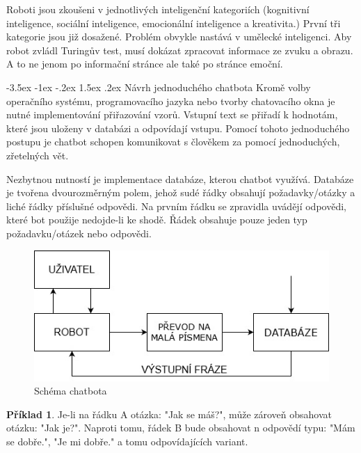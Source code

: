 \documentclass[a4paper,10pt]{article}
\makeatletter
\theoremstyle{definition}
\newtheorem*{definition}{Příklad}
\renewcommand\section{\@startsection {section}{1}{\z@}%
                                   {-3.5ex \@plus -1ex \@minus -.2ex}%
                                   {1.5ex \@plus.2ex}%
                                   {\large\bfseries}}
\makeatother
\begin{document}
Roboti jsou zkoušeni v jednotlivých inteligenční kategoriích (kognitivní inteligence, sociální inteligence, emocionální inteligence a kreativita.) První tři kategorie jsou již dosažené. Problém obvykle nastává v umělecké inteligenci. Aby robot zvládl Turingův test, musí dokázat zpracovat informace ze zvuku a obrazu. A to ne jenom po informační stránce ale také po stránce emoční. \cite{5}\cite{c}

\section{Návrh jednoduchého chatbota}
\label{sec:3}
Kromě volby operačního systému, programovacího jazyka nebo tvorby chatovacího okna je nutné implementování přiřazování vzorů. Vstupní text se přiřadí k hodnotám, které jsou uloženy v databázi a odpovídají vstupu. Pomocí tohoto jednoduchého postupu je chatbot schopen komunikovat s člověkem za pomocí jednoduchých, zřetelných vět. 

Nezbytnou nutností je implementace databáze, kterou chatbot využívá. Databáze je tvořena dvourozměrným polem, jehož sudé řádky obsahují požadavky/otázky a liché řádky příslušné odpovědi. Na prvním řádku se zpravidla uvádějí odpovědi, které bot použije nedojde-li ke shodě. Řádek obsahuje pouze jeden typ požadavku/otázek nebo odpovědi.

\begin{figure}[h] 
\begin{center}
\includegraphics[scale=0.4]{image/2.jpg}
\caption{Schéma chatbota}
\label{fig:1}
\end{center}
\end{figure}

\begin{definition}
Je-li na řádku A otázka: "Jak se máš?", může zároveň obsahovat otázku: "Jak je?".
Naproti tomu, řádek B bude obsahovat n odpovědí typu: "Mám se dobře.", "Je mi dobře." a tomu odpovídajících variant.
\end{definition}
\end{document}

